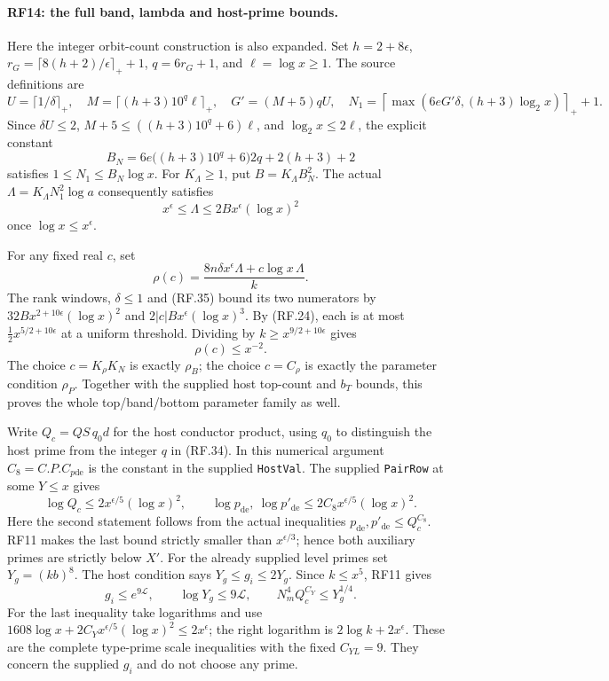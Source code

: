 \documentclass[11pt,a4paper]{article}
\numberwithin{equation}{section}
\theoremstyle{remark}\newtheorem{remark}[theorem]{Remark}
\begin{document}
\paragraph{RF14: the full band, lambda and host-prime bounds.}
Here the integer orbit-count construction is also expanded. Set
$h=2+8\epsilon$, $r_G=\lceil8(h+2)/\epsilon\rceil_++1$,
$q=6r_G+1$, and $\ell=\log x\geq1$. The source definitions are
\[
 U=\lceil1/\delta\rceil_+,\quad
 M=\lceil(h+3)10^q\ell\rceil_+,\quad
 G'=(M+5)qU,
 \quad N_1=\left\lceil\max(6eG'\delta,(h+3)\log_2x)\right\rceil_++1.
                                                               \tag{RF.34}
\]
Since $\delta U\leq2$,
$M+5\leq((h+3)10^q+6)\ell$, and $\log_2x\leq2\ell$, the
explicit constant
\[
 B_N=6e\bigl((h+3)10^q+6\bigr)2q+2(h+3)+2
\]
satisfies $1\leq N_1\leq B_N\log x$.
For $K_{\Lambda}\geq1$, put $B=K_{\Lambda}B_N^2$. The actual
$\Lambda=K_{\Lambda}N_1^2\log a$ consequently satisfies
\[
              x^\epsilon\leq\Lambda
                   \leq2B x^\epsilon(\log x)^2              \tag{RF.35}
\]
once $\log x\leq x^\epsilon$.

For any fixed real $c$, set
\[
 \rho(c)=\frac{8n\delta x^\epsilon\Lambda
                         +c\log x\,\Lambda}{k}.
\]
The rank windows, $\delta\leq1$ and (RF.35) bound its two numerators by
$32B x^{2+10\epsilon}(\log x)^2$ and
$2|c|B x^\epsilon(\log x)^3$.
By (RF.24), each is at most
$\tfrac12x^{5/2+10\epsilon}$ at a uniform threshold.
Dividing by $k\geq x^{9/2+10\epsilon}$ gives
\[
                         \rho(c)\leq x^{-2}.                \tag{RF.36}
\]
The choice $c=K_\rho K_N$ is exactly $\rho_B$; the choice
$c=C_\rho$ is exactly the parameter condition $\rho_P$.
Together with the supplied host top-count and $b_T$ bounds, this proves
the whole top/band/bottom parameter family as well.

Write $Q_c=QS\,q_0d$ for the host conductor product, using $q_0$ to
distinguish the host prime from the integer $q$ in (RF.34).
In this numerical argument $C_8=C.P.C_{p\mathrm{de}}$ is the constant
in the supplied \texttt{HostVal}.
The supplied \texttt{PairRow} at some $Y\leq x$ gives
\[
 \log Q_c\leq2x^{\epsilon/5}(\log x)^2,\qquad
 \log p_{\mathrm{de}},\ \log p'_{\mathrm{de}}
            \leq2C_8x^{\epsilon/5}(\log x)^2.
                                                               \tag{RF.37}
\]
Here the second statement follows from the actual inequalities
$p_{\mathrm{de}},p'_{\mathrm{de}}\leq Q_c^{C_8}$.
RF11 makes the last bound strictly smaller than $x^{\epsilon/3}$;
hence both auxiliary primes are strictly below $X'$.
For the already supplied level primes set $Y_g=(kb)^8$.
The host condition says $Y_g\leq g_i\leq2Y_g$. Since $k\leq x^5$,
RF11 gives
\[
 g_i\leq e^{9\mathcal L},\qquad \log Y_g\leq9\mathcal L,
 \qquad N_m^4Q_c^{C_Y}\leq Y_g^{1/4}.                       \tag{RF.38}
\]
For the last inequality take logarithms and use
$1608\log x+2C_Yx^{\epsilon/5}(\log x)^2\leq2x^\epsilon$;
the right logarithm is $2\log k+2x^\epsilon$.
These are the complete type-prime scale inequalities with the fixed
$C_{YL}=9$. They concern the supplied $g_i$ and do not choose any prime.
\end{document}
